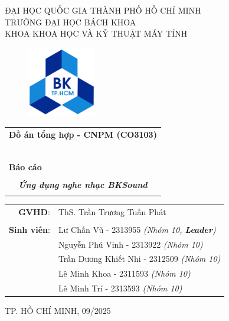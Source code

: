 \documentclass[a4paper]{article}
\begin{document}
\begin{titlepage}
\begin{center}
ĐẠI HỌC QUỐC GIA THÀNH PHỐ HỒ CHÍ MINH\\
TRƯỜNG ĐẠI HỌC BÁCH KHOA\\
KHOA KHOA HỌC VÀ KỸ THUẬT MÁY TÍNH\\
\end{center}

\vspace{1cm}

\begin{figure}[h!]
\begin{center}
\includegraphics[width=3cm]{hcmut.png}
\end{center}
\end{figure}

\vspace{1cm}


\begin{center}
\begin{tabular}{c}
\multicolumn{1}{c}{\textbf{{\Large Đồ án tổng hợp - CNPM (CO3103)}}}\\
~~\\
\hline
\\
\multicolumn{1}{l}{\textbf{{\Large Báo cáo }}}\\
\\
\textbf{\textit{{\Huge Ứng dụng nghe nhạc BKSound}}}\\
\\
\hline
\end{tabular}
\end{center}

\vspace{2cm}

\begin{table}[h]
\centering
    \begin{tabular}{rl}
    \hspace{3 cm}\textbf{GVHD}:
    & ThS. Trần Trương Tuấn Phát\\

    & \\[10pt]
\textbf{Sinh viên}: & Lư Chấn Vũ - 2313955 \emph{(Nhóm 10, \textbf{Leader})} \\
& Nguyễn Phú Vinh - 2313922 \emph{(Nhóm 10)} \\
& Trần Dương Khiết Nhi - 2312509 \emph{(Nhóm 10)} \\
& Lê Minh Khoa - 2311593 \emph{(Nhóm 10)} \\
& Lê Minh Trí - 2313593 \emph{(Nhóm 10)} \\
    \end{tabular}
\end{table}

\begin{center}
{\footnotesize TP. HỒ CHÍ MINH, 09/2025}
\end{center}
\end{titlepage}
\end{document}

